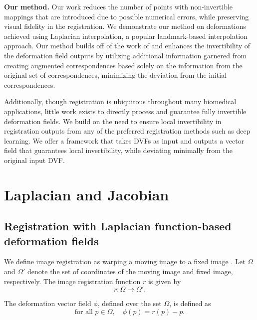 \textbf{Our method.} 
Our work reduces the number of points with non-invertible mappings that are introduced due to possible numerical errors, while preserving visual fidelity in the registration. We demonstrate our method on deformations achieved using Laplacian interpolation, a popular landmark-based interpolation approach.    
Our method builds off of the work of \cite{AgarwalRobustRegistration, RegBoost2025} and enhances the invertibility of the deformation field outputs by utilizing additional information garnered from creating augmented correspondences based solely on the information from the original set of correspondences, minimizing the deviation from the initial correspondences.

Additionally, though registration is ubiquitous throughout many biomedical applications, little work exists to directly process and guarantee fully invertible deformation fields. We build on the need to ensure local invertibility in registration outputs from any of the preferred registration methods such as deep learning. We offer a framework that takes DVFs as input and outputs a vector field that guarantees local invertibility, while deviating minimally from the original input DVF.



\section{Laplacian and Jacobian}

\subsection{Registration with Laplacian function-based deformation fields}
\label{sec:laplacian_registration}

We define image registration as warping a moving image to a fixed image \cite{Yushkevich2023}. Let $\Omega$ and $\Omega'$ denote the set of coordinates of the moving image and fixed image, respectively. The image registration function $r$ is given by 
\begin{equation} \label{eq:image_registration_definition}
    r: \Omega \rightarrow \Omega'.
\end{equation}

The deformation vector field $\phi$, defined over the set $\Omega$, is defined as 
\begin{equation} \label{eq:dvf_definition}
    \text{for all } p \in \Omega, \quad \phi(p)=r(p)-p.
\end{equation}

